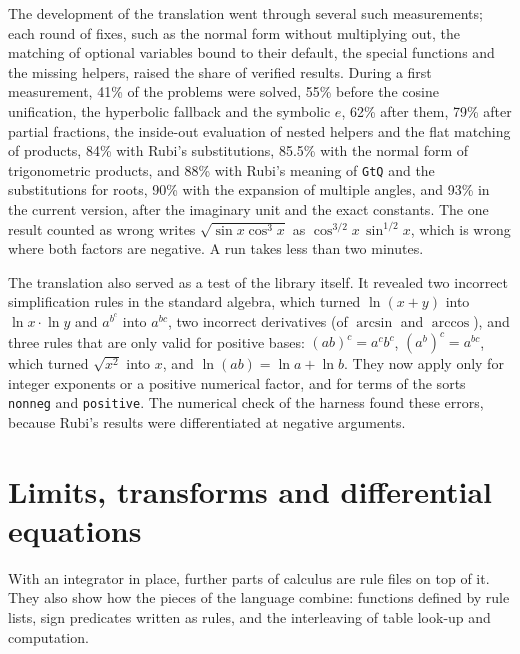 \documentclass[11pt,a4paper]{article}
\begin{document}
The development of the translation went through several such measurements;
each round of fixes, such as the normal form without multiplying out, the
matching of optional variables bound to their default, the special
functions and the missing helpers, raised the share of verified results.
During a first measurement, 41\% of the problems were solved, 55\% before
the cosine unification, the hyperbolic fallback and the symbolic $e$, 62\%
after them, 79\% after partial fractions, the inside-out evaluation of
nested helpers and the flat matching of products, 84\% with Rubi's
substitutions, 85.5\% with the normal form of trigonometric products, and
88\% with Rubi's meaning of \texttt{GtQ} and the substitutions for roots,
90\% with the expansion of multiple angles, and 93\% in the current
version, after the imaginary unit and the exact constants. The one result
counted as wrong writes $\sqrt{\sin x\cos^3x}$ as
$\cos^{3/2}x\,\sin^{1/2}x$, which is wrong where both factors are
negative. A run takes less than two minutes.

The translation also served as a test of the library itself. It revealed
two incorrect simplification rules in the standard algebra, which turned
$\ln(x+y)$ into $\ln x\cdot\ln y$ and $a^{b^c}$ into $a^{bc}$, two incorrect
derivatives (of $\arcsin$ and $\arccos$), and three rules that are only
valid for positive bases: $(ab)^c=a^c b^c$, $(a^b)^c=a^{bc}$, which turned
$\sqrt{x^2}$ into $x$, and $\ln(ab)=\ln a+\ln b$. They now apply only for
integer exponents or a positive numerical factor, and for terms of the
sorts \texttt{nonneg} and \texttt{positive}. The numerical check of the
harness found these errors, because Rubi's results were differentiated at
negative arguments.

\section{Limits, transforms and differential equations}

With an integrator in place, further parts of calculus are rule files on
top of it. They also show how the pieces of the language combine: functions
defined by rule lists, sign predicates written as rules, and the
interleaving of table look-up and computation.
\end{document}
